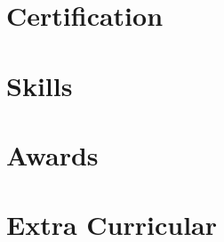 \documentclass[]{cv-style}          %
\begin{document}
\section{Certification\hrulefill}

  \vspace{-0.2cm}
  
  

\section{Skills\hrulefill}


\newpage

\section{Awards\hrulefill}




\section{Extra Curricular\hrulefill}

  \vspace{-0.2cm}



\end{document}
